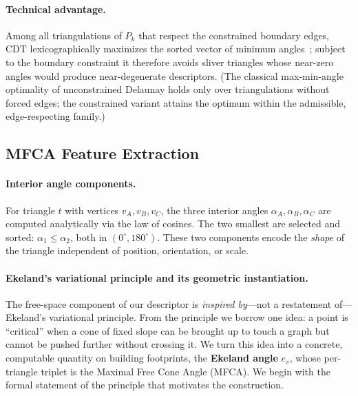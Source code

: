 \documentclass[10pt]{article}
\theoremstyle{plain}
\theoremstyle{definition}
\begin{document}
\paragraph{Technical advantage.}
Among all triangulations of $P_k$ that respect the constrained boundary edges,
CDT lexicographically maximizes the sorted vector of minimum
angles~\cite{de1997computational,chew1989cdt}; subject to the boundary
constraint it therefore avoids sliver triangles whose near-zero angles would
produce near-degenerate descriptors. (The classical max-min-angle optimality of
unconstrained Delaunay holds only over triangulations without forced edges; the
constrained variant attains the optimum within the admissible, edge-respecting
family.)

\subsection{MFCA Feature Extraction}
\label{sec:feat}
\label{sec:mfca}

\paragraph{Interior angle components.}
For triangle $t$ with vertices $v_A,v_B,v_C$, the three interior angles
$\alpha_A,\alpha_B,\alpha_C$ are computed analytically via the law of cosines.
The two smallest are selected and sorted:
$\alpha_1 \le \alpha_2$, both in $(0^\circ, 180^\circ)$.
These two components encode the \emph{shape} of the triangle independent of
position, orientation, or scale.

\paragraph{Ekeland's variational principle and its geometric instantiation.}
\label{para:ekeland}

The free-space component of our descriptor is \emph{inspired by}---not a
restatement of---Ekeland's variational principle.
From the principle we borrow one idea: a point is ``critical'' when a cone of
fixed slope can be brought up to touch a graph but cannot be pushed further
without crossing it.
We turn this idea into a concrete, computable quantity on building footprints,
the \textbf{Ekeland angle} $e_v$, whose per-triangle triplet is the Maximal Free
Cone Angle (MFCA).
We begin with the formal statement of the principle that motivates the
construction.
\end{document}
